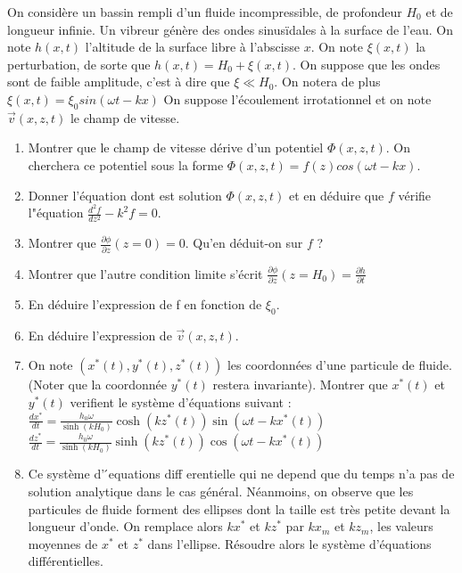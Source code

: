 \documentclass{article}
\begin{document}
On considère un bassin rempli d'un fluide incompressible, de profondeur $H_0$ et de longueur infinie.
Un vibreur génère des ondes sinusïdales à la surface de l'eau. 
On note $h(x,t)$ l'altitude de la surface libre à l'abscisse $x$. 
On note $\xi(x,t)$ la perturbation, de sorte que $h(x,t) = H_0 + \xi(x,t)$.
On suppose que les ondes sont de faible amplitude, c'est à dire que $\xi \ll H_0$.
On notera de plus $\xi(x,t)=\xi_0 sin(\omega t - kx)$
On suppose l'écoulement irrotationnel et on note $\vec{v}(x,z,t)$ le champ de vitesse.
\begin{enumerate}
    \item Montrer que le champ de vitesse dérive d'un potentiel $\Phi(x,z,t)$. 
    On cherchera ce potentiel sous la forme $\Phi(x,z,t)=f(z) cos(\omega t - kx)$.
    \item Donner l'équation dont est solution $\Phi(x,z,t)$ et en déduire que $f$ vérifie l"équation ${\frac{d^{2}f}{d z^{2}}}-k^{2}f=0$.
    \item Montrer que $\frac{\partial\phi}{\partial z}(z=0)=0$. Qu'en déduit-on sur $f$ ? 
    \item Montrer que l'autre condition limite s'écrit $\frac{\partial\phi}{\partial z}(z=H_{0})=\frac{\partial h}{\partial t}$
    \item En déduire l'expression de f en fonction de $\xi_0$. 
    \item En déduire l'expression de $\vec{v}(x,z,t)$.
    \item 
    
    On note $(x^*(t), y^*(t), z^*(t))$ les coordonnées d’une particule de fluide. (Noter que la coordonnée $y^*(t)$ restera invariante).
    Montrer que $x^*(t)$ et $ y^*(t)$  verifient le système d’équations suivant :\\[0.1cm]
    $\frac{d x^{*}}{d t}=\frac{h_{0}\omega}{\sinh(k H_{0})}\cosh(k z^{*}(t))\sin(\omega t-k x^{*}(t))$\\
    $\frac{d z^{*}}{d t}=\frac{h_{0}\omega}{\sinh(k H_{0})}\sinh(k z^{*}(t))\cos(\omega t-k x^{*}(t))$\\

    \item Ce système d’ ́equations diff erentielle qui ne depend que du temps n’a pas de solution analytique
    dans le cas général. Néanmoins, on observe que les particules de fluide forment des ellipses dont la taille est très petite devant la longueur d'onde.
   On remplace alors $kx^*$ et $kz^*$ par $kx_m$ et $kz_m$, les valeurs moyennes de $x^*$ et $z^*$ dans l'ellipse. 
   Résoudre alors le système d'équations différentielles.

\end{enumerate}
\end{document}
